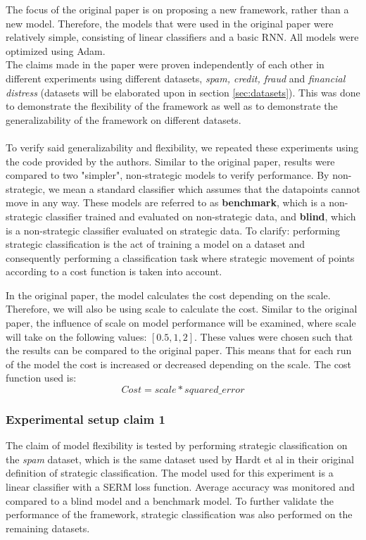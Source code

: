 The focus of the original paper is on proposing a new framework, rather than a new model. Therefore, the models that were used in the original paper were relatively simple, consisting of linear classifiers and a basic RNN. All models were optimized using Adam.\\ 
The claims made in the paper were proven independently of each other in different experiments using different datasets, \textit{spam, credit, fraud} and \textit{financial distress} (datasets will be elaborated upon in section \ref{sec:datasets}). This was done to demonstrate the flexibility of the framework as well as to demonstrate the generalizability of the framework on different datasets.\\\\ To verify said generalizability and flexibility, we repeated these experiments using the code provided by the authors. Similar to the original paper, results were compared to two "simpler", non-strategic models to verify performance. By non-strategic, we mean a standard classifier which assumes that the datapoints cannot move in any way. These models are referred to as \textbf{benchmark}, which is a non-strategic classifier trained and evaluated on non-strategic data, and \textbf{blind}, which is a non-strategic classifier evaluated on strategic data. To clarify: performing strategic classification is the act of training a model on a dataset and consequently performing a classification task where strategic movement of points according to a cost function is taken into account.

In the original paper, the model calculates the cost depending on the scale. Therefore, we will also be using scale to calculate the cost. Similar to the original paper, the influence of scale on model performance will be examined, where scale will take on the following values: $[0.5, 1, 2]$. These values were chosen such that the results can be compared to the original paper. This means that for each run of the model the cost is increased or decreased depending on the scale. The cost function used is:
\begin{equation}\label{eq:r_util}
     Cost = scale * squared\_error
\end{equation}

\subsubsection{Experimental setup claim 1}
The claim of model flexibility is tested by performing strategic classification on the \textit{spam} dataset, which is the same dataset used by Hardt et al\cite{hardt2016strategic} in their original definition of strategic classification. The model used for this experiment is a linear classifier with a SERM loss function. Average accuracy was monitored and compared to a blind model and a benchmark model. To further validate the performance of the framework, strategic classification was also performed on the remaining datasets.


